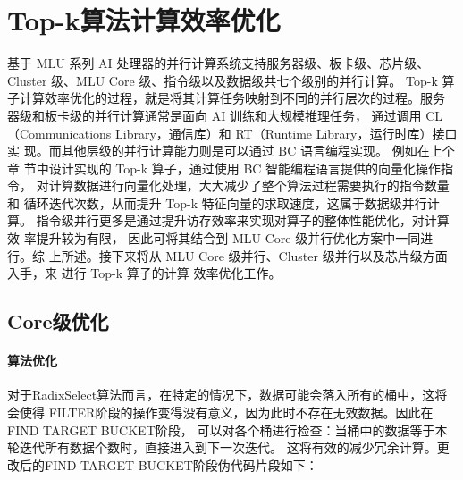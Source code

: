 \section{Top-k算法计算效率优化}
基于 MLU 系列 AI 处理器的并行计算系统支持服务器级、板卡级、芯片级、Cluster 级、MLU Core 级、指令级以及数据级共七个级别的并行计算。
Top-k 算 子计算效率优化的过程，就是将其计算任务映射到不同的并行层次的过程。服务 器级和板卡级的并行计算通常是面向 AI 训练和大规模推理任务，
通过调用 CL（Communications Library，通信库）和 RT（Runtime Library，运行时库）接口实 现。而其他层级的并行计算能力则是可以通过 BC 语言编程实现。
例如在上个章 节中设计实现的 Top-k 算子，通过使用 BC 智能编程语言提供的向量化操作指令， 对计算数据进行向量化处理，大大减少了整个算法过程需要执行的指令数量和
 循环迭代次数，从而提升 Top-k 特征向量的求取速度，这属于数据级并行计算。 指令级并行更多是通过提升访存效率来实现对算子的整体性能优化，对计算效 率提升较为有限，
 因此可将其结合到 MLU Core 级并行优化方案中一同进行。综 上所述。接下来将从 MLU Core 级并行、Cluster 级并行以及芯片级方面入手，来 进行 Top-k 算子的计算
 效率优化工作。

\subsection{Core级优化}

\paragraph{算法优化}
对于RadixSelect算法而言，在特定的情况下，数据可能会落入所有的桶中，这将会使得
FILTER阶段的操作变得没有意义，因为此时不存在无效数据。因此在FIND TARGET BUCKET阶段，
可以对各个桶进行检查：当桶中的数据等于本轮迭代所有数据个数时，直接进入到下一次迭代。
这将有效的减少冗余计算。更改后的FIND TARGET BUCKET阶段伪代码片段如下：
            

